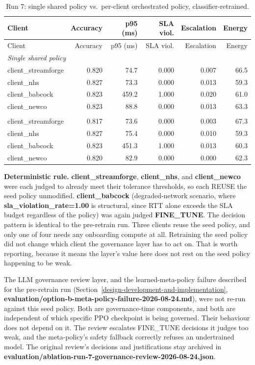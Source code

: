 \begin{longtable}{lrrrrr}
\caption{Run 7: single shared policy vs.\ per-client orchestrated policy, classifier-retrained.}\label{tab:run7}\\
\toprule
Client & Accuracy & p95 (ms) & SLA viol. & Escalation & Energy \\
\midrule
\endfirsthead
\toprule
Client & Accuracy & p95 (ms) & SLA viol. & Escalation & Energy \\
\midrule
\endhead
\multicolumn{6}{l}{\textit{Single shared policy}} \\
client\_streamforge  & 0.820 & 74.7  & 0.000 & 0.007 & 66.5 \\
client\_nhs          & 0.827 & 73.3  & 0.000 & 0.013 & 59.3 \\
client\_babcock      & 0.823 & 459.2 & 1.000 & 0.020 & 61.0 \\
client\_newco        & 0.823 & 88.8  & 0.000 & 0.013 & 63.3 \\
\addlinespace
\multicolumn{6}{l}{\textit{Policy orchestration layer}} \\
client\_streamforge  & 0.817 & 73.6  & 0.000 & 0.003 & 67.3 \\
client\_nhs          & 0.827 & 75.4  & 0.000 & 0.010 & 59.3 \\
client\_babcock      & 0.823 & 451.3 & 1.000 & 0.013 & 60.3 \\
client\_newco        & 0.820 & 82.9  & 0.000 & 0.000 & 62.3 \\
\bottomrule
\end{longtable}

\textbf{Deterministic rule.} \textbf{client\_streamforge},
\textbf{client\_nhs}, and \textbf{client\_newco} were each judged to
already meet their tolerance thresholds, so each REUSE the seed
policy unmodified. \textbf{client\_babcock} (degraded-network
scenario, where \textbf{sla\_violation\_rate=1.00} is structural,
since RTT alone exceeds the SLA budget regardless of the policy) was
again judged \textbf{FINE\_TUNE}. The decision pattern is identical to
the pre-retrain run. Three clients reuse the seed policy, and only one
of four needs any onboarding compute at all. Retraining the seed policy
did not change which client the governance layer has to act on. That is
worth reporting, because it means the layer's value here does not rest
on the seed policy happening to be weak.

The LLM governance review layer, and the learned-meta-policy failure
described for the pre-retrain run (Section~\ref{design-development-and-implementation},
\textbf{evaluation/option-b-meta-policy-failure-2026-08-24.md}), were
not re-run against this seed policy. Both are governance-time
components, and both are independent of which specific PPO checkpoint
is being governed. Their behaviour does not depend on it. The review
escalates FINE\_TUNE decisions it judges too weak, and the
meta-policy's safety fallback correctly refuses an undertrained model.
The original review's decisions and justifications stay archived in
\textbf{evaluation/ablation-run-7-governance-review-2026-08-24.json}.

